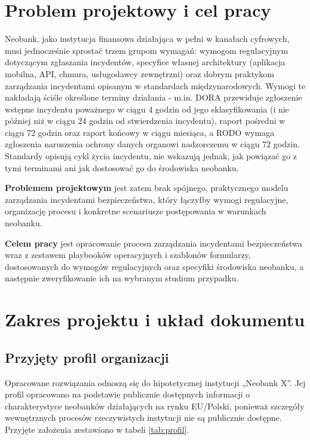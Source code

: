 \section{Problem projektowy i cel pracy}\label{sec:problem-cel}
Neobank, jako instytucja finansowa działająca w pełni w kanałach cyfrowych, musi jednocześnie sprostać trzem grupom wymagań: wymogom regulacyjnym dotyczącym zgłaszania incydentów, specyfice własnej architektury (aplikacja mobilna, API, chmura, usługodawcy zewnętrzni) oraz dobrym praktykom zarządzania incydentami opisanym w standardach międzynarodowych. Wymogi te nakładają ściśle określone terminy działania - m.in. DORA \cite{dora2022} przewiduje zgłoszenie wstępne incydentu poważnego w ciągu 4 godzin od jego sklasyfikowania (i nie później niż w ciągu 24 godzin od stwierdzenia incydentu), raport pośredni w ciągu 72 godzin oraz raport końcowy w ciągu miesiąca, a RODO \cite{rodo2016} wymaga zgłoszenia naruszenia ochrony danych organowi nadzorczemu w ciągu 72 godzin. Standardy opisują cykl życia incydentu, nie wskazują jednak, jak powiązać go z tymi terminami ani jak dostosować go do środowiska neobanku.

\textbf{Problemem projektowym} jest zatem brak spójnego, praktycznego modelu zarządzania incydentami bezpieczeństwa, który łączyłby wymogi regulacyjne, organizację procesu i konkretne scenariusze postępowania w warunkach neobanku.

\textbf{Celem pracy} jest opracowanie procesu zarządzania incydentami bezpieczeństwa wraz z zestawem playbooków operacyjnych i szablonów formularzy, dostosowanych do wymogów regulacyjnych oraz specyfiki środowiska neobanku, a następnie zweryfikowanie ich na wybranym studium przypadku.


\section{Zakres projektu i układ dokumentu}\label{sec:zakres-uklad}
\label{sec:zakres}

\subsection{Przyjęty profil organizacji}
\label{sec:profil}

Opracowane rozwiązania odnoszą się do hipotetycznej instytucji „Neobank X”. Jej profil opracowano na podstawie publicznie dostępnych informacji o charakterystyce neobanków działających na rynku EU/Polski, ponieważ szczegóły wewnętrznych procesów rzeczywistych instytucji nie są publicznie dostępne. Przyjęte założenia zestawiono w tabeli \ref{tab:profil}.

